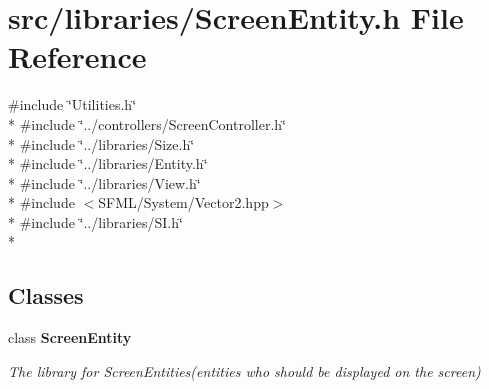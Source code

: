 \section{src/libraries/\-Screen\-Entity.h File Reference}
\label{_screen_entity_8h}
{\ttfamily \#include \char`\"{}Utilities.\-h\char`\"{}}\\*
{\ttfamily \#include \char`\"{}../controllers/\-Screen\-Controller.\-h\char`\"{}}\\*
{\ttfamily \#include \char`\"{}../libraries/\-Size.\-h\char`\"{}}\\*
{\ttfamily \#include \char`\"{}../libraries/\-Entity.\-h\char`\"{}}\\*
{\ttfamily \#include \char`\"{}../libraries/\-View.\-h\char`\"{}}\\*
{\ttfamily \#include $<$S\-F\-M\-L/\-System/\-Vector2.\-hpp$>$}\\*
{\ttfamily \#include \char`\"{}../libraries/\-S\-I.\-h\char`\"{}}\\*
\subsection*{Classes}
\begin{DoxyCompactItemize}
\item 
class {\bf Screen\-Entity}
\begin{DoxyCompactList}\small\item\em The library for Screen\-Entities(entities who should be displayed on the screen) \end{DoxyCompactList}\end{DoxyCompactItemize}
